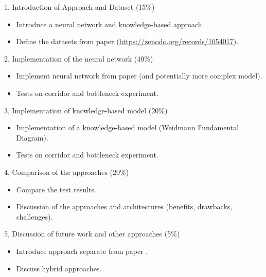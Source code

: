 \documentclass[10pt,a4paper]{article}
\begin{document}
\frontpage

\begin{task}{1, Introduction of Approach and Dataset (15\%)}
\begin{itemize}
    \item Introduce a neural network and knowledge-based approach.
    \item Define the datasets from paper \cite{tordeux2020prediction} (\url{https://zenodo.org/records/1054017}).
\end{itemize}
    
\end{task}

\begin{task}{2, Implementation of the neural network (40\%)}
\begin{itemize}
    \item Implement neural network from paper (and potentially more complex model).
    \item Tests on corridor and bottleneck experiment.
\end{itemize}

\end{task}

\begin{task}{3, Implementation of knowledge-based model (20\%)}
\begin{itemize}
    \item Implementation of a knowledge-based model (Weidmann Fundamental Diagram).
    \item Tests on corridor and bottleneck experiment.
\end{itemize}
\end{task}

\begin{task}{4, Comparison of the approaches (20\%)}
\begin{itemize}
    \item Compare the test results.
    \item Discussion of the approaches and architectures (benefits, drawbacks, challenges).
\end{itemize}

\end{task}

\begin{task}{5, Discussion of future work and other approaches (5\%)}
\begin{itemize}
    \item Introduce approach separate from paper \cite{korbmacher2022review}.
    \item Discuss hybrid approaches.
\end{itemize}

\end{task}


\end{document}
